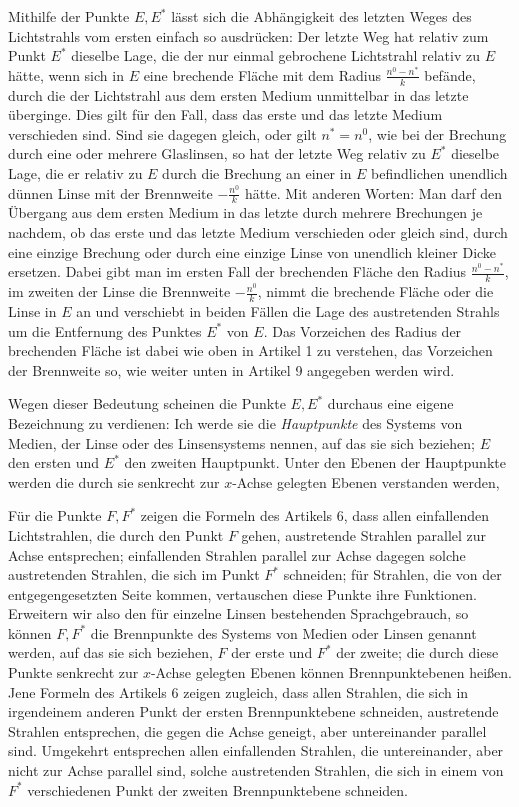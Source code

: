 Mithilfe der Punkte $E,E^*$ lässt sich die Abhängigkeit des letzten Weges des Lichtstrahls vom ersten einfach so ausdrücken: Der letzte Weg hat relativ zum Punkt $E^*$ dieselbe Lage, die der nur einmal gebrochene Lichtstrahl relativ zu $E$ hätte, wenn sich in $E$ eine brechende Fläche mit dem Radius $\frac{n^0-n^*}{k}$ befände, durch die der Lichtstrahl aus dem ersten Medium unmittelbar in das letzte überginge. Dies gilt für den Fall, dass das erste und das letzte Medium verschieden sind. Sind sie dagegen gleich, oder gilt $n^*=n^0$, wie bei der Brechung durch eine oder mehrere Glaslinsen, so hat der letzte Weg relativ zu $E^*$ dieselbe Lage, die er relativ zu $E$ durch die Brechung an einer in $E$ befindlichen unendlich dünnen Linse mit der Brennweite $-\frac{n^0}k$ hätte. Mit anderen Worten: Man darf den Übergang aus dem ersten Medium in das letzte durch mehrere Brechungen je nachdem, ob das erste und das letzte Medium verschieden oder gleich sind, durch eine einzige Brechung oder durch eine einzige Linse von unendlich kleiner Dicke ersetzen. Dabei gibt man im ersten Fall der brechenden Fläche den Radius $\frac{n^0-n^*}{k}$, im zweiten der Linse die Brennweite $-\frac{n^0}k$, nimmt die brechende Fläche oder die Linse in $E$ an und verschiebt in beiden Fällen die Lage des austretenden Strahls um die Entfernung des Punktes $E^*$ von $E$. Das Vorzeichen des Radius der brechenden Fläche ist dabei wie oben in Artikel 1 zu verstehen, das Vorzeichen der Brennweite so, wie weiter unten in Artikel 9 angegeben werden wird.

Wegen dieser Bedeutung scheinen die Punkte $E,E^*$ durchaus eine eigene Bezeichnung zu verdienen: Ich werde sie die \textit{Hauptpunkte} des Systems von Medien, der Linse oder des Linsensystems nennen, auf das sie sich beziehen; $E$ den ersten und $E^*$ den zweiten Hauptpunkt. Unter den Ebenen der Hauptpunkte werden die durch sie senkrecht zur $x$-Achse gelegten Ebenen verstanden werden,

Für die Punkte $F,F^*$ zeigen die Formeln des Artikels 6, dass allen einfallenden Lichtstrahlen, die durch den Punkt $F$ gehen, austretende Strahlen parallel zur Achse entsprechen; einfallenden Strahlen parallel zur Achse dagegen solche austretenden Strahlen, die sich im Punkt $F^*$ schneiden; für
Strahlen, die von der entgegengesetzten Seite kommen, vertauschen diese Punkte ihre Funktionen. Erweitern wir also den für einzelne Linsen bestehenden Sprachgebrauch, so können $F,F^*$ die Brennpunkte des Systems von Medien oder Linsen genannt werden, auf das sie sich beziehen, $F$ der erste und $F^*$ der zweite; die durch diese Punkte senkrecht zur $x$-Achse gelegten Ebenen können Brennpunktebenen heißen. Jene Formeln des Artikels 6 zeigen zugleich, dass allen Strahlen, die sich in irgendeinem anderen Punkt der ersten Brennpunktebene schneiden, austretende Strahlen entsprechen, die gegen die Achse geneigt, aber untereinander parallel sind. Umgekehrt entsprechen allen einfallenden Strahlen, die untereinander, aber nicht zur Achse parallel sind, solche austretenden Strahlen, die sich in einem von $F^*$ verschiedenen Punkt der zweiten Brennpunktebene schneiden.

